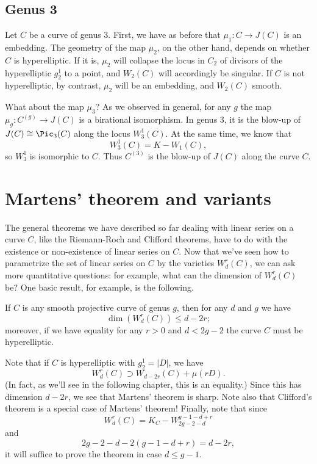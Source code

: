 \subsection{Genus 3}

Let $C$ be a curve of genus 3. First, we have as before that $\mu_1 : C \to J(C)$ is an embedding. The geometry of the map $\mu_2$, on the other hand, depends on whether  $C$ is hyperelliptic. If it is, $\mu_2$ will collapse the locus in $C_2$ of divisors of the hyperelliptic $g^1_2$ to a point, and $W_2(C)$ will accordingly be singular. If $C$ is not hyperelliptic, by contrast, $\mu_2$ will be an embedding, and $W_2(C)$ smooth.

What about the map $\mu_3$? As we observed in general, for any $g$ the map $\mu_g : C^{(g)} \to J(C)$ is a birational isomorphism. In genus 3, it is the blow-up of $J(C) \cong \Pic_3(C)$ along the locus $W^1_3(C)$. At the same time, we know that
$$
W^1_3(C) = K - W_1(C),
$$
so $W^1_3$ is isomorphic to $C$. Thus $C^{(3)}$ is the blow-up of $J(C)$ along the curve $C$.

\section{Martens' theorem and variants}

The general theorems we have described so far dealing with linear series on a curve $C$, like the Riemann-Roch and Clifford theorems, have to do with the existence or non-existence of linear series on $C$. Now that we've seen how to parametrize the set of linear series on $C$ by the varieties $W^r_d(C)$, we can ask more quantitative questions: for example, what can the dimension of $W^r_d(C)$ be? One basic result, for example, is the following.

\begin{theorem}
If $C$ is any smooth projective curve of genus $g$, then for any $d$ and $g$ we have
$$
\dim(W^r_d(C)) \leq d-2r;
$$
moreover, if we have equality for any $r > 0$ and $d < 2g-2$ the curve $C$ must be hyperelliptic.
\end{theorem}

Note that if $C$ is hyperelliptic with $g^1_2 = |D|$, we have
$$
W^r_d(C) \supset W_{d-2r}(C) + \mu(rD).
$$
(In fact, as we'll see in the following chapter, this is an equality.) Since this has dimension $d-2r$, we see that Martens' theorem is sharp. Note also that Clifford's theorem is a special case of Martens' theorem! Finally, note that since
$$
W^r_d(C) = K_C - W^{g-1-d+r}_{2g-2-d}
$$
and
$$
2g-2-d - 2(g-1-d+r) = d-2r,
$$
it will suffice to prove the theorem in case $d \leq g-1$.

